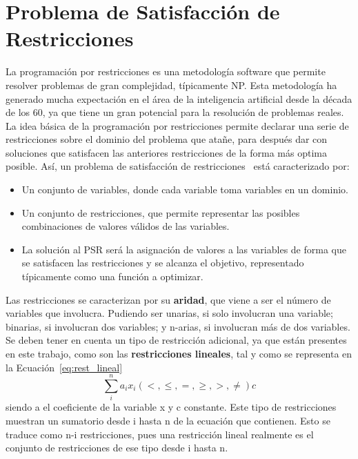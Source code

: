 \section{Problema de Satisfacción de Restricciones}
La programación por restricciones es una metodología software que permite resolver problemas de gran complejidad, típicamente NP. Esta metodología ha generado mucha expectación en el área de la inteligencia artificial desde la década de los 60, ya que tiene un gran potencial para la resolución de problemas reales. La idea básica de la programación por restricciones permite declarar una serie de restricciones sobre el dominio del problema que atañe, para después dar con soluciones que satisfacen las anteriores restricciones de la forma más optima posible. Así, un problema de satisfacción de restricciones~\cite{Russ06} está caracterizado por:
\begin{itemize}
	\item Un conjunto de variables, donde cada variable toma variables en un dominio.
	\item Un conjunto de restricciones, que permite representar las posibles combinaciones de valores válidos de las variables.
	\item La solución al \gls{PSR} será la asignación de valores a las variables de forma que se satisfacen las restricciones y se alcanza el objetivo, representado típicamente como una función a optimizar.
\end{itemize}
Las restricciones se caracterizan por su \textbf{aridad}, que viene a ser el número de variables que involucra. Pudiendo ser unarias, si solo involucran una variable; binarias, si involucran dos variables; y n-arias, si involucran más de dos variables. Se deben tener en cuenta un tipo de restricción adicional, ya que están presentes en este trabajo, como son las \textbf{restricciones lineales}, tal y como se representa en la Ecuación~\ref{eq:rest_lineal}
\begin{equation}
  \label{eq:rest_lineal}
  \sum_{i}^{n} a_{i}x_{i} (<,\leq,=,\geq,>,\neq) c
\end{equation}
siendo a el coeficiente de la variable x y c constante. Este tipo de restricciones muestran un sumatorio desde i hasta n de la ecuación que contienen. Esto se traduce como n-i restricciones, pues una restricción lineal realmente es el conjunto de restricciones de ese tipo desde i hasta n.\\
